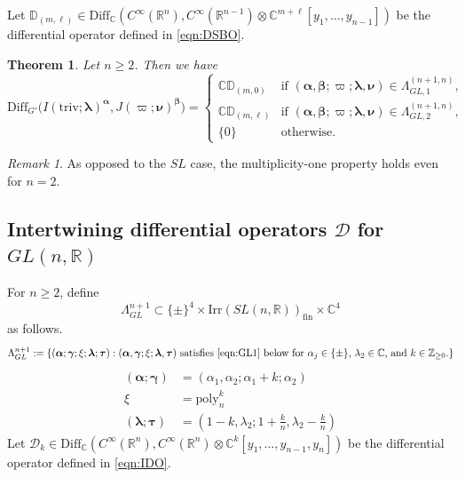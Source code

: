 \documentclass[reqno,11pt]{amsart}
\newtheorem{thm}[equation]{Theorem}
\theoremstyle{remark}
\newtheorem{rem}[equation]{Remark}
\theoremstyle{definition}
\numberwithin{equation}{section}
\newcommand{\R}{\mathbb{R}}
\newcommand{\C}{\mathbb{C}}
\newcommand{\Z}{\mathbb{Z}}
\newcommand{\Cal}{\mathcal}
\newcommand{\poly}{\mathrm{poly}}
\newcommand{\Diff}{\mathrm{Diff}}
\newcommand{\Irr}{\mathrm{Irr}}
\newcommand{\triv}{\mathrm{triv}}
\newcommand{\fin}{\mathrm{fin}}
\newcommand{\balpha}{\bm{\alpha}}
\newcommand{\bgamma}{\bm{\gamma}}
\newcommand{\blambda}{\bm{\lambda}}
\newcommand{\btau}{\bm{\tau}}
\newcommand{\D}{\Cal{D}}
\newcommand{\bD}{\mathbb{D}}
\begin{document}
Let $\bD_{(m,\ell)} \in \Diff_\C(C^\infty(\R^{n}), C^\infty(\R^{n-1})\otimes 
\C^{m+\ell}[y_1, \ldots, y_{n-1}])$ be the differential operator defined in \eqref{eqn:DSBO}.


\begin{thm}\label{thm:GL-DSBO}
Let $n\geq 2$. Then we have
\begin{equation*}
\Diff_{G'}\big(I(\triv; \bm{\lambda})^{\bm{\alpha}}, J(\varpi; \bm{\nu})^{\bm{\beta}}\big)
=
\begin{cases}
\C\bD_{(m,0)} 
& \text{if $(\bm{\alpha}, \bm{\beta};\varpi; \bm{\lambda}, \bm{\nu})\in \Lambda^{(n+1,n)}_{GL,1}$,}\\[3pt]
\C \bD_{(m,\ell)} 
& \text{if $(\bm{\alpha}, \bm{\beta};\varpi; \bm{\lambda}, \bm{\nu})\in \Lambda^{(n+1,n)}_{GL,2}$,}\\
\{0\} & \text{otherwise.}
\end{cases}
\end{equation*}
\end{thm}

\begin{rem}
As opposed to the $SL$ case, the multiplicity-one property holds even for $n=2$.
\end{rem}

\subsection{
Intertwining differential operators $\D$ for $GL(n,\R)$
}
\label{sec:GL-IDO}

For $n\geq 2$,
define 
\begin{equation*}
\Lambda^{n+1}_{GL} \subset 
 \{\pm\}^4 \times \Irr(SL(n,\R))_{\fin} \times \C^4
\end{equation*}
as follows.
\begin{equation*}
\Lambda^{n+1}_{GL}:=\{(\balpha;\bgamma; \xi; \blambda; \btau):
\text{$(\balpha,\bgamma; \xi; \blambda, \btau)$ satisfies \eqref{eqn:GL1} below
for $\alpha_j \in \{\pm\}$, $\lambda_2 \in \C$, and $k\in \Z_{\geq 0}$.} \}
\end{equation*}
\begin{equation}\label{eqn:GL1}
\begin{aligned}
(\balpha;\bgamma) &= (\alpha_1, \alpha_2; \alpha_1+k; \alpha_2)\\
\xi &=\poly_{n}^k\\
(\blambda;\btau)&= (1-k, \lambda_2; 1+\tfrac{k}{n},\lambda_2-\tfrac{k}{n})
\end{aligned}
\end{equation}
\noindent
Let $\D_k \in \Diff_\C(C^\infty(\R^{n}), C^\infty(\R^{n})\otimes 
\C^k[y_1, \ldots, y_{n-1}, y_{n}])$ be the differential operator defined in 
\eqref{eqn:IDO}.
\end{document}

